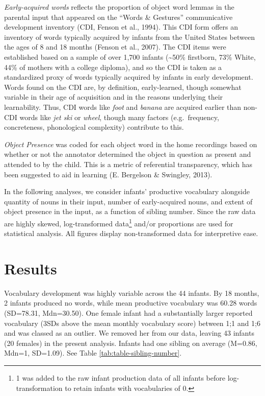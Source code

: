 \documentclass[
  english,
  man,floatsintext]{apa6}
\begin{document}
\emph{Early-acquired words} reflects the proportion of object word lemmas in the parental input that appeared on the ``Words \& Gestures'' communicative development inventory (CDI, Fenson et al., 1994). This CDI form offers an inventory of words typically acquired by infants from the United States between the ages of 8 and 18 months (Fenson et al., 2007). The CDI items were established based on a sample of over 1,700 infants (\textasciitilde50\% firstborn, 73\% White, 44\% of mothers with a college diploma), and so the CDI is taken as a standardized proxy of words typically acquired by infants in early development. Words found on the CDI are, by definition, early-learned, though somewhat variable in their age of acquisition and in the reasons underlying their learnability. Thus, CDI words like \emph{foot} and \emph{banana} are acquired earlier than non-CDI words like \emph{jet ski} or \emph{wheel}, though many factors (e.g.~frequency, concreteness, phonological complexity) contribute to this.

\emph{Object Presence} was coded for each object word in the home recordings based on whether or not the annotator determined the object in question as present and attended to by the child. This is a metric of referential transparency, which has been suggested to aid in learning (E. Bergelson \& Swingley, 2013).

In the following analyses, we consider infants' productive vocabulary alongside quantity of nouns in their input, number of early-acquired nouns, and extent of object presence in the input, as a function of sibling number. Since the raw data are highly skewed, log-transformed data\footnote{1 was added to the raw infant production data of all infants before log-transformation to retain infants with vocabularies of 0.} and/or proportions are used for statistical analysis. All figures display non-transformed data for interpretive ease.

\hypertarget{results}{%
\section{Results}\label{results}}

Vocabulary development was highly variable across the 44 infants. By 18 months, 2 infants produced no words, while mean productive vocabulary was 60.28 words (SD=78.31, Mdn=30.50). One female infant had a substantially larger reported vocabulary (3SDs above the mean monthly vocabulary score) between 1;1 and 1;6 and was classed as an outlier. We removed her from our data, leaving 43 infants (20 females) in the present analysis. Infants had one sibling on average (M=0.86, Mdn=1, SD=1.09). See Table \ref{tab:table-sibling-number}.
\end{document}
